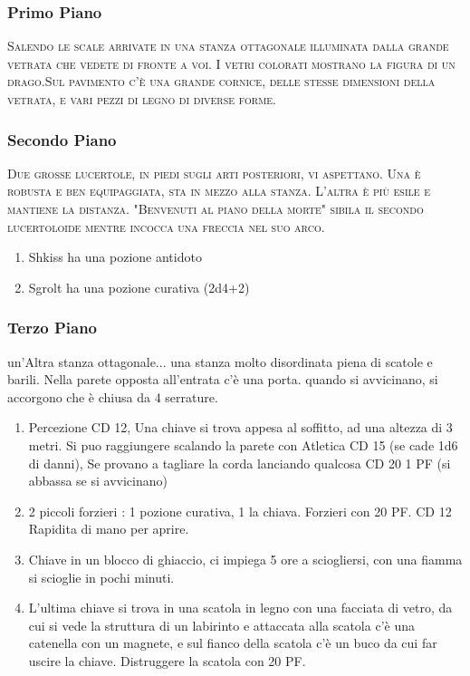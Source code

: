 \documentclass{article}
\begin{document}
\subsubsection{Primo Piano}
    \textsc{Salendo le scale arrivate in una stanza ottagonale illuminata dalla grande vetrata che vedete di fronte a voi. I vetri colorati mostrano la figura di un drago.Sul pavimento c'è una grande cornice, delle stesse dimensioni della vetrata, e vari pezzi di legno di diverse forme.}
\subsubsection{Secondo Piano}
\textsc{Due grosse lucertole, in piedi sugli arti posteriori, vi aspettano.
Una è robusta e ben equipaggiata, sta in mezzo alla stanza.
L'altra è più esile e mantiene la distanza. "Benvenuti al piano
della morte" sibila il secondo lucertoloide mentre incocca una
freccia nel suo arco.}

\begin{enumerate}
    \item Shkiss ha una pozione antidoto
    \item Sgrolt ha una pozione curativa (2d4+2) 
\end{enumerate}

\subsubsection{Terzo Piano}
un'Altra stanza ottagonale... una stanza molto disordinata piena di scatole e barili. Nella parete opposta all'entrata c'è una porta. quando si avvicinano, si accorgono che è chiusa da 4 serrature. 
\begin{enumerate}
    \item Percezione CD 12, Una chiave si trova appesa al soffitto, ad una altezza di 3 metri. Si puo raggiungere scalando la parete con Atletica CD 15 (se cade 1d6 di danni), Se provano a tagliare la corda lanciando qualcosa CD 20 1 PF
    (si abbassa se si avvicinano)
    \item 2 piccoli forzieri : 1 pozione curativa, 1 la chiava. Forzieri con 20 PF. CD 12 Rapidita di mano per aprire.
    \item Chiave in un blocco di ghiaccio, ci impiega 5 ore a sciogliersi, con una fiamma si scioglie in pochi minuti. 
    \item L'ultima chiave si trova in una scatola in legno con una facciata di vetro, da cui si vede la struttura di un labirinto e attaccata alla scatola c'è una catenella con un magnete, e sul fianco della scatola c'è un buco da cui far uscire la chiave. Distruggere la scatola con 20 PF.
    \end{enumerate}
\end{document}
